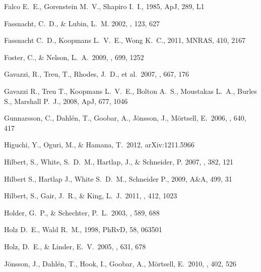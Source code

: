 \begin{thebibliography}{99}
 Falco E.~E., Gorenstein M.~V., Shapiro I.~I., 1985, ApJ, 289, L1 


{Fassnacht}, C.~D., \& {Lubin}, L.~M. 2002, \aj, 123, 627

 Fassnacht C.~D., Koopmans L.~V.~E., Wong K.~C., 2011, MNRAS, 410, 2167 

 Foster, C., \& Nelson, L.~A.\ 2009, \apj, 699, 1252 

 Gavazzi, R., Treu, T., 
Rhodes, J.~D., et al.\ 2007, \apj, 667, 176 

 Gavazzi R., Treu T., Koopmans L.~V.~E., 
Bolton A.~S., Moustakas L.~A., Burles S., Marshall P.~J., 2008, ApJ, 677, 
1046 

 Gunnarsson, C., 
Dahl{\'e}n, T., Goobar, A., J{\"o}nsson, J., M{\"o}rtsell, E.\ 2006, \apj, 640, 417 

 Higuchi, Y., Oguri, M., 
\& Hamana, T.\ 2012, arXiv:1211.5966 

{Hilbert}, S., {White}, S.~D.~M., {Hartlap}, J., \& {Schneider}, P. 2007,
  \mnras, 382, 121

 Hilbert S., Hartlap J., White S.~D.~M., Schneider P., 2009, A\&A, 499, 31 

 Hilbert, S., Gair, 
J.~R., \& King, L.~J.\ 2011, \mnras, 412, 1023 

 Holder, G.~P., \& Schechter, P.~L.\ 2003, \apj, 589, 688 


 Holz D.~E., Wald R.~M., 1998, PhRvD, 58, 063501 

 Holz, D.~E., \& Linder, E.~V.\ 2005, \apj, 631, 678 

 J{\"o}nsson, J., 
Dahl{\'e}n, T., Hook, I., Goobar, A., M{\"o}rtsell, E.\ 2010, \mnras, 402, 526 


\end{thebibliography}
